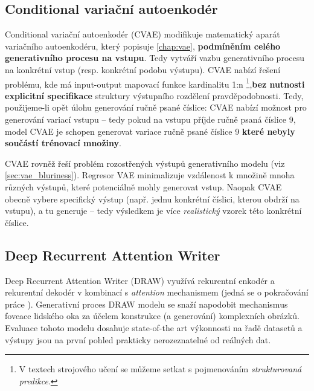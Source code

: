 \subsection{Conditional variační autoenkodér}
\label{sec:cvae}
Conditional variační autoenkodér (CVAE) \cite{Sohn2015} modifikuje matematický aparát variačního autoenkodéru, který popisuje \autoref{chap:vae}, \textbf{podmíněním celého generativního procesu na vstupu}. Tedy vytváří vazbu generativního procesu na konkrétní vstup (resp. konkrétní podobu výstupu).
CVAE nabízí řešení problému, kde má input-output mapovací funkce kardinalitu 1:n
\footnote{V textech strojového učení se můžeme setkat s pojmenováním \emph{strukturovaná predikce}.},\textbf{bez nutnosti explicitní specifikace} struktury výstupního rozdělení pravděpodobnosti.
Tedy, použijeme-li opět úlohu generování ručně psané číslice: CVAE nabízí možnost pro generování variací vstupu – tedy pokud na vstupu příjde ručně psaná číslice 9, model CVAE je schopen generovat variace ručně psané číslice 9 \textbf{které nebyly součástí trénovací množiny}.

CVAE rovněž řeší problém rozostřených výstupů generativního modelu (viz \autoref{sec:vae_bluriness}). Regresor VAE minimalizuje vzdálenost k množině mnoha různých výstupů, které potenciálně mohly generovat vstup. Naopak CVAE obecně vybere specifický výstup (např. jednu konkrétní číslici, kterou obdrží na vstupu), a tu generuje – tedy výsledkem je více \emph{realistický} vzorek této konkrétní číslice.  
\cite{Doersch2021}

\subsection{Deep Recurrent Attention Writer}
Deep Recurrent Attention Writer (DRAW) \cite{Gregor2015} využívá rekurentní enkodér a rekurentní dekodér v kombinací s \emph{attention} mechanismem (jedná se o pokračování práce \cite{Gregor2014}).
Generativní proces DRAW modelu se snaží napodobit mechanismus foveace lidského oka za účelem konstrukce (a generování) komplexních obrázků.
Evaluace tohoto modelu dosahuje state-of-the art výkonnosti na řadě datasetů a výstupy jsou na první pohled prakticky nerozeznatelné od reálných dat. \cite{Gregor2015}
